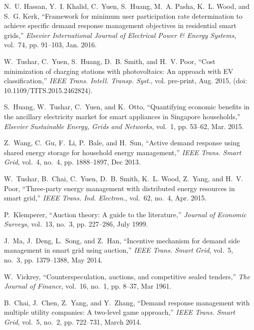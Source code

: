 \documentclass[journal,10pt]{IEEEtran}
\begin{document}
\begin{thebibliography}{10}
N.~U. Hassan, Y.~I. Khalid, C.~Yuen, S.~Huang, M.~A. Pasha, K.~L. Wood, and
  S.~G. Kerk, ``Framework for minimum user participation rate determination to
  achieve specific demand response management objectives in residential smart
  grids,'' \emph{Elsevier International Journal of Electrical Power \& Energy
  Systems}, vol.~74, pp. 91--103, Jan. 2016.

W.~Tushar, C.~Yuen, S.~Huang, D.~B. Smith, and H.~V. Poor, ``Cost minimization
  of charging stations with photovoltaics: An approach with {EV}
  classification,'' \emph{IEEE Trans. Intell. Transp. Syst.}, vol. pre-print,
  Aug. 2015, (doi: 10.1109/TITS.2015.2462824).

S.~Huang, W.~Tushar, C.~Yuen, and K.~Otto, ``Quantifying economic benefits in
  the ancillary electricity market for smart appliances in {Singapore}
  households,'' \emph{Elsevier Sustainable Energy, Grids and Networks}, vol.~1,
  pp. 53--62, Mar. 2015.

Z.~Wang, C.~Gu, F.~Li, P.~Bale, and H.~Sun, ``Active demand response using
  shared energy storage for household energy management,'' \emph{IEEE Trans.
  Smart Grid}, vol.~4, no.~4, pp. 1888--1897, Dec 2013.

W.~Tushar, B.~Chai, C.~Yuen, D.~B. Smith, K.~L. Wood, Z.~Yang, and H.~V. Poor,
  ``Three-party energy management with distributed energy resources in smart
  grid,'' \emph{IEEE Trans. Ind. Electron.}, vol.~62, no.~4, Apr. 2015.

P.~Klemperer, ``Auction theory: {A} guide to the literature,'' \emph{Journal of
  Economic Surveys}, vol.~13, no.~3, pp. 227--286, July 1999.

J.~Ma, J.~Deng, L.~Song, and Z.~Han, ``Incentive mechanism for demand side
  management in smart grid using auction,'' \emph{IEEE Trans. Smart Grid},
  vol.~5, no.~3, pp. 1379--1388, May 2014.

W.~Vickrey, ``Counterspeculation, auctions, and competitive sealed tenders,''
  \emph{The Journal of Finance}, vol.~16, no.~1, pp. 8--37, Mar 1961.

B.~Chai, J.~Chen, Z.~Yang, and Y.~Zhang, ``Demand response management with
  multiple utility companies: {A} two-level game approach,'' \emph{IEEE Trans.
  Smart Grid}, vol.~5, no.~2, pp. 722--731, March 2014.


\end{thebibliography}
\end{document}

